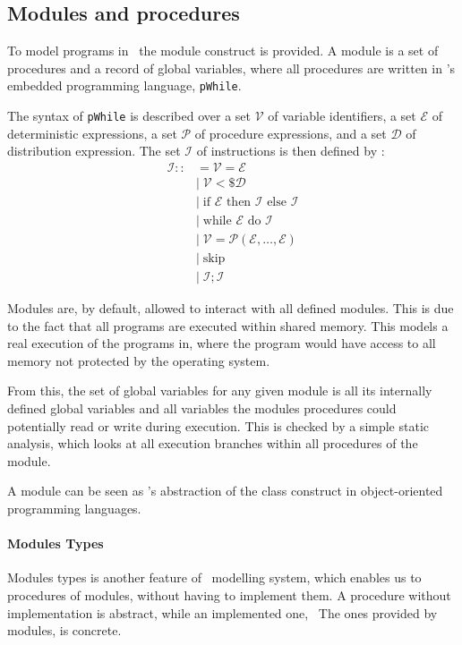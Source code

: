 \subsection{Modules and procedures}
\label{sec:ec_modules}
To model programs in \easycrypt\ the module construct is provided.
A module is a set of procedures and a record of global variables, where all
procedures are written in \easycrypt's embedded programming language, \texttt{pWhile}.

The syntax of \texttt{pWhile} is described over a set $\mathcal{V}$ of variable
identifiers, a set $\mathcal{E}$ of deterministic expressions, a set
$\mathcal{P}$ of procedure expressions, and a set $\mathcal{D}$ of distribution
expression.
The set $\mathcal{I}$ of instructions is then defined
by \cite{zkcrypt}:
\begin{align*}
  \mathcal{I} ::&= \mathcal{V} = \mathcal{E} \\
              &|\; \mathcal{V} <\$ \mathcal{D} \\
              &|\; \text{if } \mathcal{E} \text{ then } \mathcal{I} \text{ else } \mathcal{I} \\
              &|\; \text{while } \mathcal{E} \text{ do } \mathcal{I} \\
              &|\; \mathcal{V} = \mathcal{P}(\mathcal{E}, \dots, \mathcal{E}) \\
              &|\; \text{skip} \\
              &|\; \mathcal{I}; \mathcal{I}
\end{align*}

Modules are, by default, allowed to interact with all defined modules.
This is due to the fact that all programs are executed within shared memory. This
models a real execution of the programs in, where the program would have access to
all memory not protected by the operating system.

From this, the set of global variables for any given module is all its
internally defined global variables and all variables the modules procedures
could potentially read or write during execution. This is checked by a simple
static analysis, which looks at all execution branches within all procedures of the module.

A module can be seen as \easycrypt's abstraction of the class construct
in object-oriented programming languages.

\paragraph{Modules Types}
\label{sec:ec_module_types}
Modules types is another feature of \easycrypt\ modelling system, which
enables us to procedures of modules, without having to implement
them. A procedure without implementation is abstract, while
an implemented one, \ie\ The ones provided by modules, is concrete.

